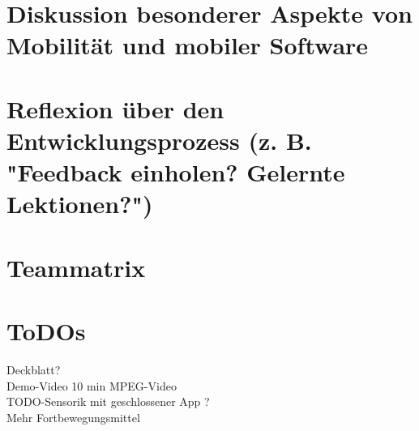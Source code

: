 \documentclass[a4paper,11pt]{article}
\begin{document}
\section{Diskussion besonderer Aspekte von Mobilität und mobiler Software}


\section{Reflexion über den Entwicklungsprozess (z. B. "Feedback einholen? Gelernte Lektionen?")}


\section{Teammatrix}

\section{ToDOs}
Deckblatt?\\
Demo-Video 10 min MPEG-Video\\
TODO-Sensorik mit geschlossener App ?\\
Mehr Fortbewegungsmittel\\
\end{document}
